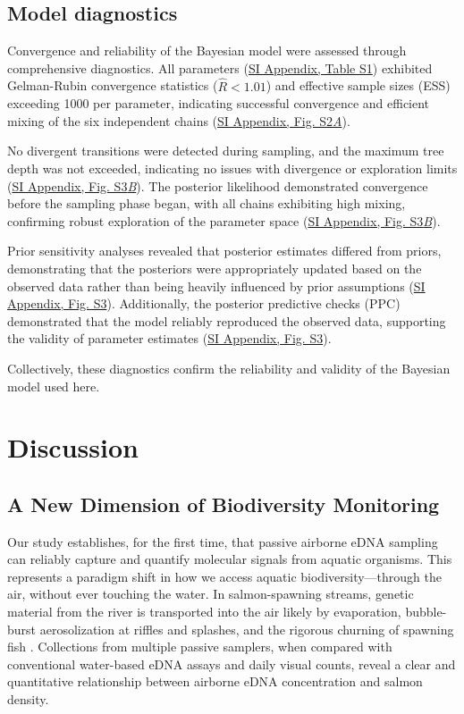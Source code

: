 \documentclass{article}
\begin{document}
\subsection{Model diagnostics}

Convergence and reliability of the Bayesian model were assessed through comprehensive diagnostics. All parameters (\href{SI_Appendix.pdf}{SI Appendix, Table S1}) exhibited Gelman-Rubin convergence statistics ($\hat{R} < 1.01$) and effective
sample sizes (ESS) exceeding 1000 per parameter, indicating successful convergence and efficient mixing of
the six independent chains (\href{SI_Appendix.pdf}{SI Appendix, Fig. S2\textit{A}}). 


No divergent transitions were detected during sampling, and the maximum tree depth was not exceeded, indicating no issues with divergence or exploration limits (\href{SI_Appendix.pdf}{SI Appendix, Fig. S3\textit{B}}). The posterior likelihood demonstrated convergence before the sampling phase began, with all chains exhibiting high mixing, confirming robust exploration of the parameter space (\href{SI_Appendix.pdf}{SI Appendix, Fig. S3\textit{B}}).

Prior sensitivity analyses revealed that posterior estimates differed from priors, demonstrating that the posteriors were appropriately updated based on the observed data rather than being heavily influenced by prior assumptions (\href{SI_Appendix.pdf}{SI Appendix, Fig. S3}). Additionally, the posterior predictive checks (PPC) demonstrated that the model reliably reproduced the observed data, supporting the validity of parameter estimates (\href{SI_Appendix.pdf}{SI Appendix, Fig. S3}). 

Collectively, these diagnostics confirm the reliability and validity of the Bayesian model used here.


\section{Discussion}
\subsection{A New Dimension of Biodiversity Monitoring}
Our study establishes, for the first time, that passive airborne eDNA sampling can reliably capture and quantify molecular signals from aquatic organisms. This represents a paradigm shift in how we access aquatic biodiversity—through the air, without ever touching the water. In salmon-spawning streams, genetic material from the river is transported into the air likely by evaporation, bubble-burst aerosolization at riffles and splashes, and the rigorous churning of spawning fish \cite{wood2021,prather2013}. Collections from multiple passive samplers, when compared with conventional water-based eDNA assays and daily visual counts, reveal a clear and quantitative relationship between airborne eDNA concentration and salmon density. 
\end{document}
